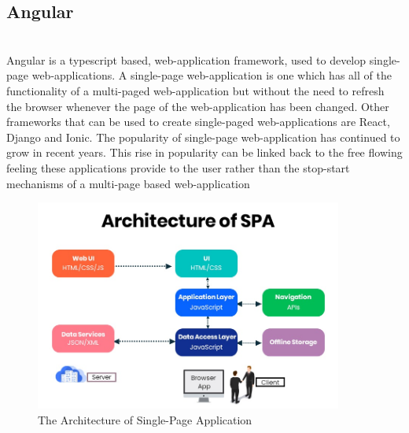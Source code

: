 \subsection{Angular} \\
Angular is a typescript based, web-application framework, used to develop single-page web-applications. A single-page web-application is one which has all of the functionality of a multi-paged web-application but without the need to refresh the browser whenever the page of the web-application has been changed. Other frameworks that can be used to create single-paged web-applications are React, Django and Ionic. The popularity of single-page web-application has continued to grow in recent years. This rise in popularity can be linked back to the free flowing feeling these applications provide to the user rather than the stop-start mechanisms of a multi-page based web-application \cite{spa}

\begin{figure}[h!]
	\caption{The Architecture of Single-Page Application}
	\centering
	\includegraphics[width=0.9\textwidth]{images/spa}
\end{figure}

